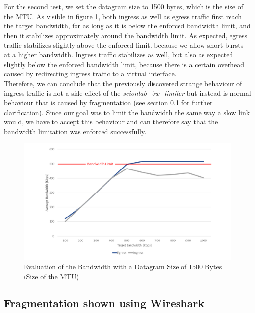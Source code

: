 For the second test, we set the datagram size to 1500 bytes, which is the size of the \acs{MTU}. As visible in figure \ref{Evaluation of the Bandwidth with a Datagram Size of 1500 Bytes (Size of the MTU)}, both ingress as well as egress traffic first reach the target bandwidth, for as long as it is below the enforced bandwidth limit, and then it stabilizes approximately around the bandwidth limit. As expected, egress traffic stabilizes slightly above the enforced limit, because we allow short bursts at a higher bandwidth. Ingress traffic stabilizes as well, but also as expected slightly below the enforced bandwidth limit, because there is a certain overhead caused by redirecting ingress traffic to a virtual interface.
\\
Therefore, we can conclude that the previously discovered strange behaviour of ingress traffic is not a side effect of the \textit{scionlab\_bw\_limiter} but instead is normal behaviour that is caused by fragmentation (see section \ref{Fragmentation shown using Wireshark} for further clarification). Since our goal was to limit the bandwidth the same way a slow link would, we have to accept this behaviour and can therefore say that the bandwidth limitation was enforced successfully.

\begin{figure}[h]
	\centering
	\includegraphics[width=\textwidth]{img/Evaluation-Bandwidth-Small-Buffer.png}
	\caption{Evaluation of the Bandwidth with a Datagram Size of 1500 Bytes (Size of the MTU)}
	\label{Evaluation of the Bandwidth with a Datagram Size of 1500 Bytes (Size of the MTU)}
\end{figure}

\newpage

\subsection{Fragmentation shown using Wireshark}\label{Fragmentation shown using Wireshark}

